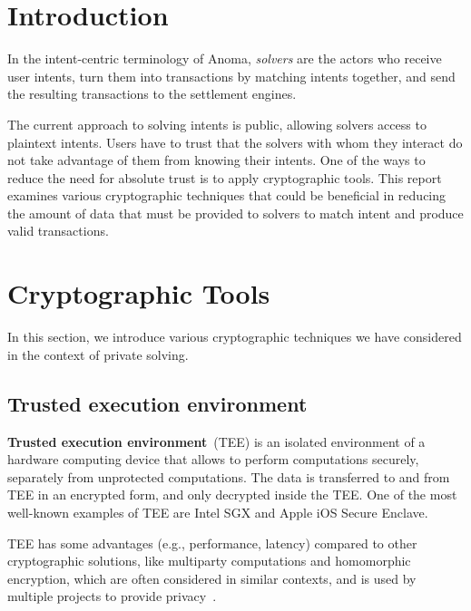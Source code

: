 \documentclass[
    9pt,            %
    report,        %
    affiltop,       %
]{art}
\begin{document}
\maketitle

\section{Introduction}\label{intro}

In the intent-centric terminology of Anoma, \emph{solvers} are the actors who receive user intents, turn them into transactions by matching intents together, and send the resulting transactions to the settlement engines. 

The current approach to solving intents is public, allowing solvers access to plaintext intents. Users have to trust that the solvers with whom they interact do not take advantage of them from knowing their intents. One of the ways to reduce the need for absolute trust is to apply cryptographic tools. This report examines various cryptographic techniques that could be beneficial in reducing the amount of data that must be provided to solvers to match intent and produce valid transactions.

\section{Cryptographic Tools}\label{tools}

In this section, we introduce various cryptographic techniques we have considered in the context of private solving. 

\subsection{Trusted execution environment}\label{TEE}

\textbf{Trusted execution environment}~(TEE) is an isolated environment of a
hardware computing device that allows to perform computations securely,
separately from unprotected computations. The data is transferred to and from
TEE in an encrypted form, and only decrypted inside the TEE. One of the most
well-known examples of TEE are Intel SGX and Apple iOS Secure Enclave. 

TEE has some advantages (e.g., performance, latency) compared to other cryptographic solutions, like multiparty computations and homomorphic encryption, which are often considered in similar contexts, and is used by multiple projects to provide privacy~\citep{flash,secret}.
\end{document}
